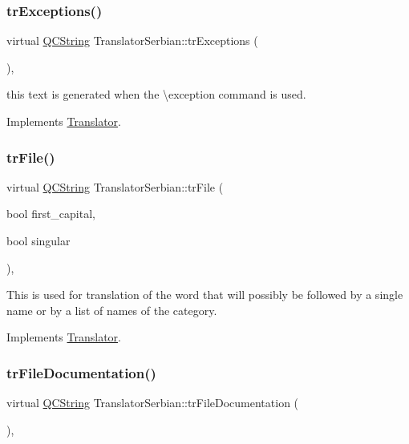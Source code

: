 \subsubsection{\texorpdfstring{trExceptions()}{trExceptions()}}
{\footnotesize\ttfamily virtual \mbox{\hyperlink{class_q_c_string}{Q\+C\+String}} Translator\+Serbian\+::tr\+Exceptions (\begin{DoxyParamCaption}{ }\end{DoxyParamCaption})\hspace{0.3cm}{\ttfamily [inline]}, {\ttfamily [virtual]}}

this text is generated when the \textbackslash{}exception command is used. 

Implements \mbox{\hyperlink{class_translator}{Translator}}.

\mbox{\label{class_translator_serbian_af0ea27663393602d5fd4c44416bf8a1c}} 
\subsubsection{\texorpdfstring{trFile()}{trFile()}}
{\footnotesize\ttfamily virtual \mbox{\hyperlink{class_q_c_string}{Q\+C\+String}} Translator\+Serbian\+::tr\+File (\begin{DoxyParamCaption}\item[{bool}]{first\+\_\+capital,  }\item[{bool}]{singular }\end{DoxyParamCaption})\hspace{0.3cm}{\ttfamily [inline]}, {\ttfamily [virtual]}}

This is used for translation of the word that will possibly be followed by a single name or by a list of names of the category. 

Implements \mbox{\hyperlink{class_translator}{Translator}}.

\mbox{\label{class_translator_serbian_a0879462f1955e136115808a1f0531056}} 
\subsubsection{\texorpdfstring{trFileDocumentation()}{trFileDocumentation()}}
{\footnotesize\ttfamily virtual \mbox{\hyperlink{class_q_c_string}{Q\+C\+String}} Translator\+Serbian\+::tr\+File\+Documentation (\begin{DoxyParamCaption}{ }\end{DoxyParamCaption})\hspace{0.3cm}{\ttfamily [inline]}, {\ttfamily [virtual]}}

